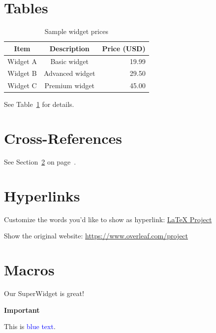 \documentclass[12pt]{article}
\begin{document}
\section{Tables}
\begin{table}[H]
  \centering
  \begin{tabular}{c c r}
    \hline
    Item & Description & Price (USD)\\ \hline
    Widget A & Basic widget & 19.99 \\
    Widget B & Advanced widget & 29.50 \\
    Widget C & Premium widget & 45.00 \\ \hline
  \end{tabular}
  \caption{Sample widget prices}
  \label{tab:prices}
\end{table}

See Table~\ref{tab:prices} for details.

\section{Cross-References}\label{crossref}
See Section~\ref{crossref} on page~\pageref{fig:sample}.

\section{Hyperlinks}
Customize the words you'd like to show as hyperlink:
\href{https://www.latex-project.org}{LaTeX Project}

Show the original website:
\url{https://www.overleaf.com/project}

\section{Macros}

\newcommand{\ProductName}{SuperWidget}
Our \ProductName{} is great!

\newcommand{\bt}[1]{\textbf{#1}} %
\bt{Important}

\newcommand{\bluetext}[1]{\textcolor{blue}{#1}}
This is \bluetext{blue text}.
\end{document}
